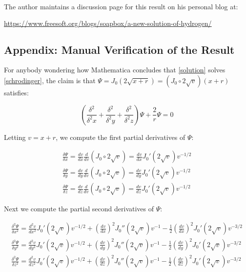 \documentclass{article}
\begin{document}
The author maintains a discussion page for this result on his personal blog at:

\begin{center}
\small
\url{https://www.freesoft.org/blogs/soapbox/a-new-solution-of-hydrogen/}
\end{center}

\vfill\eject
\subsection*{Appendix: Manual Verification of the Result}
For anybody wondering how Mathematica concludes that \eqref{solution} solves \eqref{schrodinger},
the claim is that $\Psi = J_0(2\sqrt{x+r}) = (J_0 \circ 2\sqrt{v}) (x+r)$ satisfies:

\begin{equation}
\label{claim}
\left(\frac{\delta^2}{\delta^2 x} + \frac{\delta^2}{\delta^2 y} + \frac{\delta^2}{\delta^2 z}\right) \Psi + \frac{2}{r}\Psi = 0
\end{equation}

\vskip 12pt

Letting $v=x+r$, we compute the first partial derivatives of $\Psi$:

\begin{equation}
\begin{gathered}
\frac{\delta \Psi}{\delta x} = \frac{d v}{d x} \frac{d}{d v} \left(J_0 \circ 2\sqrt{v}\right) = \frac{d v}{d x} J_0'(2\sqrt{v}) v^{-1/2} \\
\frac{\delta \Psi}{\delta y} = \frac{d v}{d y} \frac{d}{d v} \left(J_0 \circ 2\sqrt{v}\right) = \frac{d v}{d y} J_0'(2\sqrt{v}) v^{-1/2} \\
\frac{\delta \Psi}{\delta z} = \frac{d v}{d z} \frac{d}{d v} \left(J_0 \circ 2\sqrt{v}\right) = \frac{d v}{d z} J_0'(2\sqrt{v}) v^{-1/2}
\end{gathered}
\end{equation}

\vskip 12pt

Next we compute the partial second derivatives of $\Psi$:

\begin{equation}
\label{second partials}
\begin{gathered}
\frac{\delta^2 \Psi}{\delta x^2} = \frac{d^2 v}{d x^2} J_0'(2\sqrt{v}) v^{-1/2} + \left(\frac{d v}{d x}\right)^2 J_0''(2\sqrt{v}) v^{-1} - \frac{1}{2} \left(\frac{d v}{d x}\right)^2 J_0'(2\sqrt{v}) v^{-3/2} \\
\frac{\delta^2 \Psi}{\delta y^2} = \frac{d^2 v}{d y^2} J_0'(2\sqrt{v}) v^{-1/2} + \left(\frac{d v}{d y}\right)^2 J_0''(2\sqrt{v}) v^{-1} - \frac{1}{2} \left(\frac{d v}{d y}\right)^2 J_0'(2\sqrt{v}) v^{-3/2} \\
\frac{\delta^2 \Psi}{\delta z^2} = \frac{d^2 v}{d z^2} J_0'(2\sqrt{v}) v^{-1/2} + \left(\frac{d v}{d z}\right)^2 J_0''(2\sqrt{v}) v^{-1} - \frac{1}{2} \left(\frac{d v}{d z}\right)^2 J_0'(2\sqrt{v}) v^{-3/2}
\end{gathered}
\end{equation}
\end{document}
